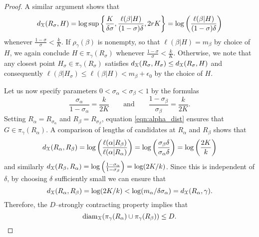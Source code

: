 \documentclass[letterpaper,fleqn]{article}
\theoremstyle{plain}
\theoremstyle{definition}
\DeclareMathOperator{\diam}{diam}
\newcommand{\os}{{\EuScript X}} %
\newcommand{\len}{\ell}  %
\newcommand{\cp}{\pi} %
\newcommand{\minlen}{m}  %
\newcommand{\minpts}{\rho} %
\renewcommand{\diam}{\mathrm{diam}}
\begin{document}
\begin{proof}
A similar argument shows that
\begin{equation}\label{eqn:beta_dist}
d_\os(R_\sigma, H)  = \log\sup\left\{\frac{K}{\delta\sigma},\frac{\ell(\beta\vert H)}{(1-\sigma)\delta}, 2rK\right\} = \log\left(\frac{\len(\beta\vert H)}{(1-\sigma)\delta}\right)
\end{equation}
whenever $\frac{1-\sigma}{\sigma} < \frac{k}{K}$. If $\minpts_\gamma(\beta)$ is nonempty, so that $\len(\beta\vert H) = \minlen_\beta$ by choice of $H$, we again conclude $H\in \cp_\gamma(R_\sigma)$ whenever $\frac{1-\sigma}{\sigma}< \frac{k}{K}$. Otherwise, we note that any closest point $H_\sigma \in \cp_\gamma(R_\sigma)$ satisfies $d_\os(R_\sigma,H_\sigma)\le d_\os(R_\sigma,H)$ and consequently $\len(\beta\vert H_\sigma)\le \len(\beta\vert H) < \minlen_\beta + \epsilon_0$ by the choice of $H$.

Let us now specify parameters $0 < \sigma_\alpha < \sigma_\beta < 1$ by the formulas
\[\frac{\sigma_\alpha}{1-\sigma_\alpha} = \frac{k}{2K} \qquad\text{and}\qquad \frac{1-\sigma_\beta}{\sigma_\beta} = \frac{k}{2K}.\]
Setting $R_\alpha = R_{\sigma_\alpha}$ and $R_\beta = R_{\sigma_\beta}$, equation \eqref{eqn:alpha_dist} ensures that $G\in \cp_\gamma(R_\alpha)$. A comparison of lengths of candidates at $R_\alpha$ and $R_\beta$ shows that
\[d_\os(R_\alpha,R_\beta) = \log\left(\frac{\ell(\alpha\vert R_\beta)}{\ell(\alpha\vert R_\alpha)}\right) = \log\left(\frac{\sigma_\beta\delta}{\sigma_\alpha \delta}\right) = \log\left(\frac{2K}{k}\right) \]
and similarly $d_\os(R_\beta,R_\alpha) = \log\left(\frac{1-\sigma_\alpha}{1-\sigma_\beta}\right) = \log(2K/k)$. Since this is independent of $\delta$, by choosing $\delta$ sufficiently small we can ensure that
\[d_\os(R_\alpha,R_\beta) = \log(2K/k) < \log(\minlen_\alpha/\delta \sigma_\alpha) = d_\os(R_\alpha,\gamma).\]
Therefore, the $D$--strongly contracting property implies that
\begin{equation}\label{eqn:diameterbound_for_lipschitz_lemma}
\diam_\os(\cp_\gamma(R_\alpha)\cup \cp_\gamma(R_\beta)) \le D.
\end{equation}


\end{proof}
\end{document}
